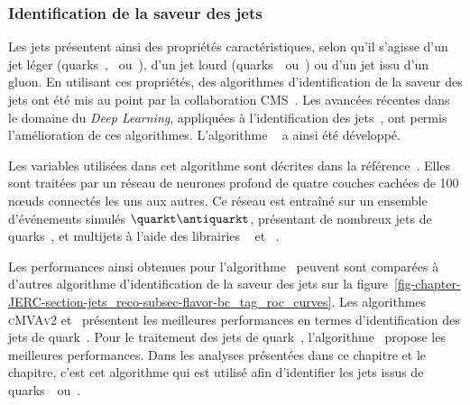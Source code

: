 \subsubsection{Identification de la saveur des jets}
Les jets présentent ainsi des propriétés caractéristiques, selon qu'il s'agisse d'un jet léger (quarks~\quarkd, \quarku\ ou~\quarks), d'un jet lourd (quarks~\quarkc\ ou~\quarkb) ou d'un jet issu d'un gluon.
En utilisant ces propriétés, des algorithmes d'identification de la saveur des jets ont été mis au point par la collaboration CMS~\cite{jet_btag_CSV_RunI}.
Les avancées récentes dans le domaine du \emph{Deep Learning}, appliquées à l'identification des jets~\cite{jet_flavor_deep_nn}, ont permis l'amélioration de ces algorithmes. L'algorithme \DeepCSV~\cite{Sirunyan_heavy_flavor_jets_2018} a ainsi été développé.
\par Les variables utilisées dans cet algorithme sont décrites dans la référence~\cite{Sirunyan_heavy_flavor_jets_2018}.
Elles sont traitées par un réseau de neurones profond de quatre couches cachées de 100 nœuds connectés les uns aux autres.
Ce réseau est entraîné sur un ensemble d'événements simulés $\quarkt\antiquarkt$, présentant de nombreux jets de quarks~\quarkb, et multijets à l'aide des librairies
\KERAS~\cite{keras}
et
\TENSORFLOW~\cite{tensorflow}.
\par Les performances ainsi obtenues pour l'algorithme \DeepCSV\ peuvent sont comparées à d'autres algorithme d'identification de la saveur des jets sur la figure~\ref{fig-chapter-JERC-section-jets_reco-subsec-flavor-bc_tag_roc_curves}.
Les algorithmes \textsc{cMVAv2} et \DeepCSV\ présentent les meilleures performances en termes d'identification des jets de quark~\quarkb.
Pour le traitement des jets de quark~\quarkc, l'algorithme \DeepCSV\ propose les meilleures performances.
Dans les analyses présentées dans ce chapitre et le chapitre, c'est cet algorithme qui est utilisé afin d'identifier les jets issus de quarks~\quarkc\ ou~\quarkb.
